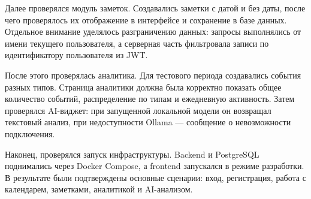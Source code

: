 \documentclass[14pt,a4paper]{extreport}
\begin{document}
Далее проверялся модуль заметок. Создавались заметки с датой и без даты, после чего проверялось их отображение в интерфейсе и сохранение в базе данных. Отдельное внимание уделялось разграничению данных: запросы выполнялись от имени текущего пользователя, а серверная часть фильтровала записи по идентификатору пользователя из JWT.

После этого проверялась аналитика. Для тестового периода создавались события разных типов. Страница аналитики должна была корректно показать общее количество событий, распределение по типам и ежедневную активность. Затем проверялся AI-виджет: при запущенной локальной модели он возвращал текстовый анализ, при недоступности Ollama --- сообщение о невозможности подключения.

Наконец, проверялся запуск инфраструктуры. Backend и PostgreSQL поднимались через Docker Compose, а frontend запускался в режиме разработки. В результате были подтверждены основные сценарии: вход, регистрация, работа с календарем, заметками, аналитикой и AI-анализом.
\end{document}

